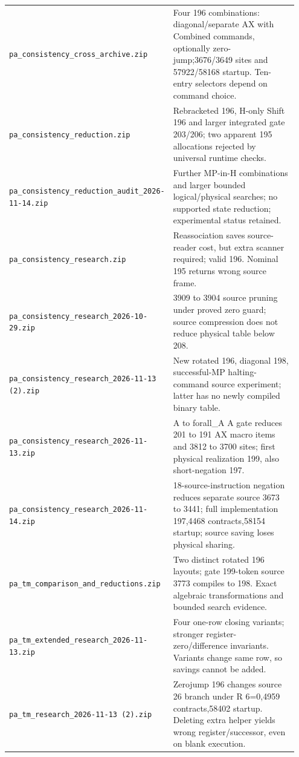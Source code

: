 \begin{longtable}{@{}p{0.38\linewidth}p{0.57\linewidth}@{}}
\nolinkurl{pa_consistency_cross_archive.zip} & Four 196 combinations: diagonal/separate AX with Combined commands, optionally zero-jump;3676/3649 sites and 57922/58168 startup. Ten-entry selectors depend on command choice.\\[5pt]
\nolinkurl{pa_consistency_reduction.zip} & Rebracketed 196, H-only Shift 196 and larger integrated gate 203/206; two apparent 195 allocations rejected by universal runtime checks.\\[5pt]
\nolinkurl{pa_consistency_reduction_audit_2026-11-14.zip} & Further MP-in-H combinations and larger bounded logical/physical searches; no supported state reduction; experimental status retained.\\[5pt]
\nolinkurl{pa_consistency_research.zip} & Reassociation saves source-reader cost, but extra scanner required; valid 196. Nominal 195 returns wrong source frame.\\[5pt]
\nolinkurl{pa_consistency_research_2026-10-29.zip} & 3909 to 3904 source pruning under proved zero guard; source compression does not reduce physical table below 208.\\[5pt]
\nolinkurl{pa_consistency_research_2026-11-13 (2).zip} & New rotated 196, diagonal 198, successful-MP halting-command source experiment; latter has no newly compiled binary table.\\[5pt]
\nolinkurl{pa_consistency_research_2026-11-13.zip} & A to forall\_A A gate reduces 201 to 191 AX macro items and 3812 to 3700 sites; first physical realization 199, also short-negation 197.\\[5pt]
\nolinkurl{pa_consistency_research_2026-11-14.zip} & 18-source-instruction negation reduces separate source 3673 to 3441; full implementation 197,4468 contracts,58154 startup; source saving loses physical sharing.\\[5pt]
\nolinkurl{pa_tm_comparison_and_reductions.zip} & Two distinct rotated 196 layouts; gate 199-token source 3773 compiles to 198. Exact algebraic transformations and bounded search evidence.\\[5pt]
\nolinkurl{pa_tm_extended_research_2026-11-13.zip} & Four one-row closing variants; stronger register-zero/difference invariants. Variants change same row, so savings cannot be added.\\[5pt]
\nolinkurl{pa_tm_research_2026-11-13 (2).zip} & Zerojump 196 changes source 26 branch under R 6=0,4959 contracts,58402 startup. Deleting extra helper yields wrong register/successor, even on blank execution.\\[5pt]

\end{longtable}
